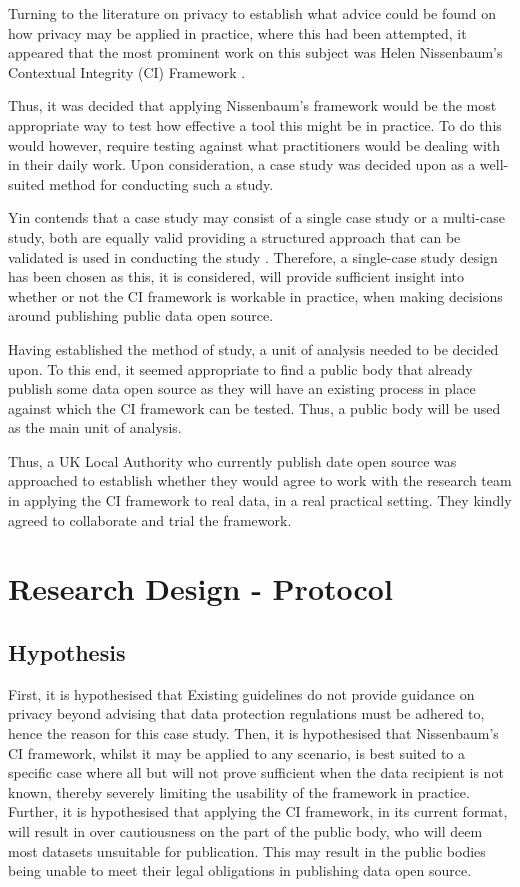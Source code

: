 Turning to the literature on privacy to establish what advice could be found on how privacy may be applied in practice, where this had been attempted, it appeared that the most prominent work on this subject was Helen Nissenbaum's Contextual Integrity (CI) Framework \cite{Nissenbaum_2010}.

Thus, it was decided that applying Nissenbaum's framework would be the most appropriate way to test how effective a tool this might be in practice. To do this would however, require testing against what practitioners would be dealing with in their daily work. Upon consideration, a case study was decided upon as a well-suited method for conducting such a study. 

Yin contends that a case study may consist of a single case study or a multi-case study, both are equally valid providing a structured approach that can be validated is used in conducting the study \cite{Yin_Case_studies_and_org_in_1985}. Therefore, a single-case study design has been chosen as this, it is considered, will provide sufficient insight into whether or not the CI framework is workable in practice, when making decisions around publishing public data open source.

Having established the method of study, a unit of analysis needed to be decided upon. To this end, it seemed appropriate to find a public body that already publish some data open source as they will have an existing process in place against which the CI framework can be tested. Thus, a public body will be used as the main unit of analysis. 

Thus, a UK Local Authority who currently publish date open source was approached to establish whether they would agree to work with the research team in applying the CI framework to real data, in a real practical setting. They kindly agreed to collaborate and trial the framework.

\section {Research Design - Protocol}

\subsection {Hypothesis}

First, it is hypothesised that Existing guidelines do not provide guidance on privacy beyond advising that data protection regulations must be adhered to, hence the reason for this case study. Then, it is hypothesised that Nissenbaum's CI framework, whilst it may be applied to any scenario, is best suited to a specific case where all but will not prove sufficient when the data recipient is not known, thereby severely limiting the usability of the framework in practice.  Further, it is hypothesised that applying the CI framework, in its current format, will result in over cautiousness on the part of the public body, who will deem most datasets unsuitable for publication. This may result in the public bodies being unable to meet their legal obligations in publishing data open source. 

